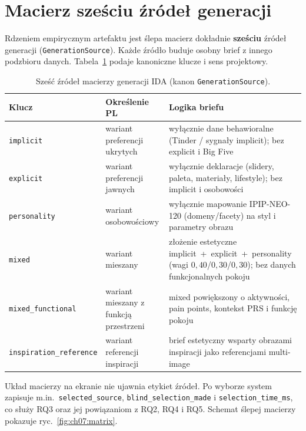 \section{Macierz sześciu źródeł generacji}
\label{ch07:sec:macierz}

Rdzeniem empirycznym artefaktu jest ślepa macierz dokładnie \textbf{sześciu} źródeł generacji (\texttt{GenerationSource}). Każde źródło buduje osobny brief z innego podzbioru danych. Tabela~\ref{tab:ch07:sources} podaje kanoniczne klucze i sens projektowy.

\begin{table}[htbp]
  \centering
  \caption{Sześć źródeł macierzy generacji IDA (kanon \texttt{GenerationSource}).}
  \label{tab:ch07:sources}
  \begin{tabular}{@{}p{}p{}p{}@{}}
    \toprule
    Klucz & Określenie PL & Logika briefu \\
    \midrule
    \texttt{implicit} &
    wariant preferencji ukrytych &
    wyłącznie dane behawioralne (Tinder / sygnały implicit); bez explicit i Big Five \\
    \texttt{explicit} &
    wariant preferencji jawnych &
    wyłącznie deklaracje (slidery, paleta, materiały, lifestyle); bez implicit i osobowości \\
    \texttt{personality} &
    wariant osobowościowy &
    wyłącznie mapowanie IPIP-NEO-120 (domeny/facety) na styl i parametry obrazu \\
    \texttt{mixed} &
    wariant mieszany &
    złożenie estetyczne implicit~+~explicit~+~personality (wagi $0{,}40$/$0{,}30$/$0{,}30$); bez danych funkcjonalnych pokoju \\
    \texttt{mixed\_functional} &
    wariant mieszany z funkcją przestrzeni &
    mixed powiększony o aktywności, pain points, kontekst PRS i funkcję pokoju \\
    \texttt{inspiration\_reference} &
    wariant referencji inspiracji &
    brief estetyczny wsparty obrazami inspiracji jako referencjami multi-image \\
    \bottomrule
  \end{tabular}
\end{table}

Układ macierzy na ekranie nie ujawnia etykiet źródeł. Po wyborze system zapisuje m.in.\ \texttt{selected\_source}, \texttt{blind\_selection\_made} i \texttt{selection\_time\_ms}, co służy RQ3 oraz jej powiązaniom z RQ2, RQ4 i RQ5. Schemat ślepej macierzy pokazuje ryc.~\ref{fig:ch07:matrix}.


